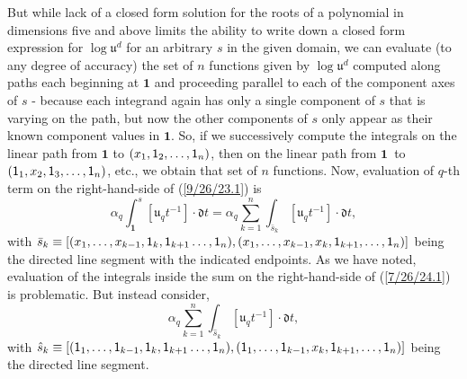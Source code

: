 \documentclass{amsart}
\numberwithin{equation}{section}
\theoremstyle{definition}
\numberwithin{theorem}{section}
\begin{document}
But while lack of a closed form solution for the roots of a polynomial in dimensions five and above limits the ability to write down a closed form expression for $\log\mathfrak{u}^d$ for an arbitrary $s$ in the given domain, we can evaluate (to any degree of accuracy) the set of $n$ functions given by $\log\mathfrak{u}^d$ computed along paths each beginning at $\mathbf{1}$ and proceeding parallel to each of the component axes of $s$ - because each integrand again has only a single component of $s$ that is varying on the path, but now the other components of $s$ only appear as their known component values in $\mathbf{1}$.  
So, if we successively compute the integrals on the linear path from $\mathbf{1}$ to $(x_1,{\sf 1}_2,\dots,{\sf 1}_n)$, then on the linear path from \mbox{$\mathbf{1}$ to} $({\sf 1}_1,x_2,{\sf 1}_3,\dots,{\sf 1}_n)$, etc., we obtain that set of $n$ functions. 
 Now, evaluation of $q$-th term on the right-hand-side of (\ref{9/26/23.1}) is \begin{equation}\label{7/26/24.1} \alpha_q\int_{\mathbf{1}}^s [\mathfrak{u}_q t^{-1}]\cdot \mathfrak{d}t = \alpha_q\sum_{k=1}^n \int_{\bar{s}_k} [\mathfrak{u}_q t^{-1}]\cdot \mathfrak{d}t,\end{equation} with $\bar{s}_k \equiv [(x_1,\dots,x_{k-1},{\sf 1}_{k},{\sf 1}_{k+1}\dots,{\sf 1}_n),(x_1,\dots,x_{k-1},x_k,{\sf 1}_{k+1},\dots,{\sf 1}_n)]$ being the directed line segment with the indicated endpoints.   As we have noted, evaluation of the integrals inside the sum on the right-hand-side of (\ref{7/26/24.1}) is problematic.  But instead consider,  \begin{equation}\label{7/26/24.2}\alpha_q\sum_{k=1}^n \int_{\hat{s}_k} [\mathfrak{u}_q t^{-1}]\cdot \mathfrak{d}t,\end{equation} with $\hat{s}_k \equiv [({\sf 1}_1,\dots,{\sf 1}_{k-1},{\sf 1}_{k},{\sf 1}_{k+1}\dots,{\sf 1}_n),({\sf 1}_1,\dots,{\sf 1}_{k-1},x_k,{\sf 1}_{k+1},\dots,{\sf 1}_n)]$ being the directed line segment. 
\end{document}

